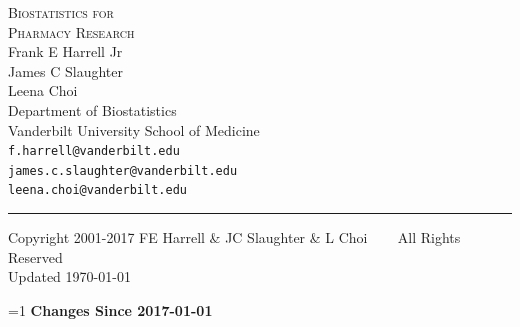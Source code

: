 \documentclass{report}
\begin{document}
\begin{flushright}
\Huge
\textsc{Biostatistics for\\Pharmacy Research}\\[2ex]
\huge Frank E Harrell Jr \\ James C Slaughter \\ Leena Choi \\
\Large
Department of Biostatistics \\
Vanderbilt University School of Medicine \\
\texttt{f.harrell@vanderbilt.edu} \\ \texttt{james.c.slaughter@vanderbilt.edu} \\ \texttt{leena.choi@vanderbilt.edu} 
\small
\end{flushright}
\rule{\linewidth}{1mm}
\begin{center}
\vspace{.5in}
\small
Copyright 2001-2017 FE Harrell \& JC Slaughter \& L Choi ~~~ All Rights Reserved
\\ \hfill \scriptsize Updated \today
\end{center}
\fi

\thispagestyle{empty}
\pagestyle{headings}

\setcounter{tocdepth}{1}


\tableofcontents

\def\changeHistoryShow{1}     %
\ifnum\changeHistoryShow=1
\bigskip
\need 3.5in
\textbf{Changes Since 2017-01-01}
\end{document}
